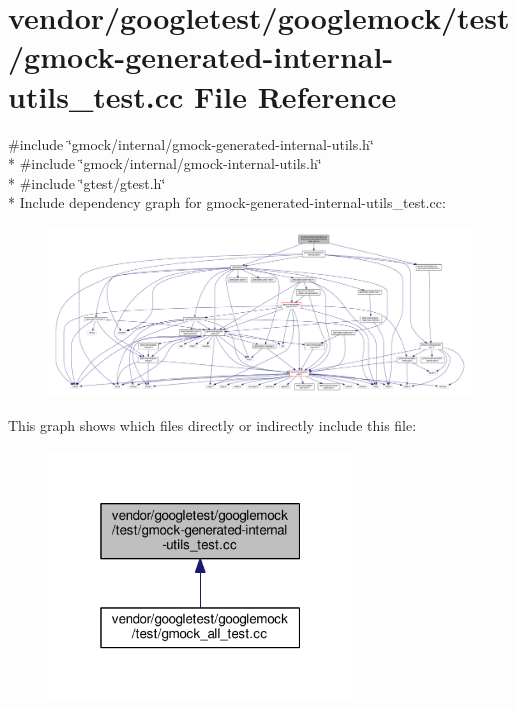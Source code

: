 \hypertarget{gmock-generated-internal-utils__test_8cc}{}\section{vendor/googletest/googlemock/test/gmock-\/generated-\/internal-\/utils\+\_\+test.cc File Reference}
\label{gmock-generated-internal-utils__test_8cc}
{\ttfamily \#include \char`\"{}gmock/internal/gmock-\/generated-\/internal-\/utils.\+h\char`\"{}}\\*
{\ttfamily \#include \char`\"{}gmock/internal/gmock-\/internal-\/utils.\+h\char`\"{}}\\*
{\ttfamily \#include \char`\"{}gtest/gtest.\+h\char`\"{}}\\*
Include dependency graph for gmock-\/generated-\/internal-\/utils\+\_\+test.cc\+:\nopagebreak
\begin{figure}[H]
\begin{center}
\leavevmode
\includegraphics[width=350pt]{gmock-generated-internal-utils__test_8cc__incl}
\end{center}
\end{figure}
This graph shows which files directly or indirectly include this file\+:\nopagebreak
\begin{figure}[H]
\begin{center}
\leavevmode
\includegraphics[width=229pt]{gmock-generated-internal-utils__test_8cc__dep__incl}
\end{center}
\end{figure}
